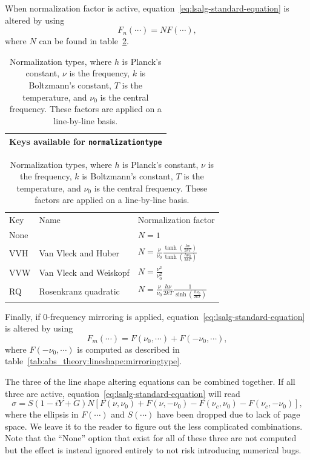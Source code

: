 When normalization factor is active, equation~\ref{eq:lsalg-standard-equation} is altered by using
\begin{equation}
 F_n(\cdots) = N F(\cdots),
\end{equation}
where $N$ can be found in table~\ref{tab:abs_theory:lineshape:normalizationtype}.

\begin{table}[ht!]
 \centering
 \begin{tabular}{c}
  Keys available for \verb|normalizationtype|\\\hline
 \end{tabular}
 \begin{tabular}{lll}
  Key&Name&Normalization factor\\
  None&&$N=1$\\[5pt]
  VVH&Van Vleck and Huber& $N = \frac{\nu}{\nu_0}\frac{\tanh \left( \frac{h\nu} {2kT} \right)}{\tanh \left( \frac{h\nu_0} {2kT} \right)} $ \\[5pt]
  VVW&Van Vleck and Weiskopf&$N = \frac{\nu^2}{\nu^2_0}$\\[5pt]
  RQ&Rosenkranz quadratic& $N = \frac{\nu}{\nu_0} \frac{h\nu}{2kT} \frac{1}{\left. \sinh\left( \frac{h\nu_0} {2kT} \right) \right.} $
 \end{tabular}
 \caption{Normalization types, where $h$ is Planck's constant, $\nu$ is the frequency, $k$ is Boltzmann's constant,
 $T$ is the temperature, and $\nu_0$ is the central frequency.  These factors are applied on a line-by-line basis.}
 \label{tab:abs_theory:lineshape:normalizationtype}
\end{table}

Finally, if 0-frequency mirroring is applied, equation~\ref{eq:lsalg-standard-equation}
is altered by using
\begin{equation}
 F_m(\cdots)= F(\nu_0, \cdots) + F(-\nu_0, \cdots),
\end{equation}
where $F(-\nu_0, \cdots)$ is computed as described in table~\ref{tab:abs_theory:lineshape:mirroringtype}.

The three of the line shape altering equations can be combined together.  If all three are active,
equation~\ref{eq:lsalg-standard-equation} will read
\begin{equation}
 \sigma = S \left(1 - iY + G\right) N \left[F\left(\nu, \nu_0 \right) + F\left(\nu, -\nu_0 \right) - F\left(\nu_c, \nu_0 \right)  - F\left(\nu_c, -\nu_0 \right) \right],
\end{equation}
where the ellipsis in $F(\cdots)$ and $S(\cdots)$ have been dropped due to lack of page space.
We leave it to the reader to figure out the less complicated combinations.
Note that the ``None'' option that exist for all of these three are not computed but
the effect is instead ignored entirely to not risk introducing numerical bugs.

